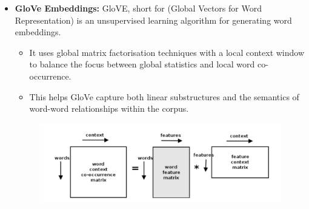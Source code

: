 \begin{itemize}
    \item \textbf{GloVe Embeddings: } GloVE, short for (Global Vectors for Word Representation) is an unsupervised learning algorithm for generating word embeddings.
    \begin{itemize}
        \item It uses global matrix factorisation techniques with a local context window to balance the focus between global statistics and local word co-occurrence.
        \item This helps GloVe capture both linear substructures and the semantics of word-word relationships within the corpus.
    \end{itemize}
    \begin{figure}[H]
        \centering
        \includegraphics[width=0.75\linewidth]{img/glove.png}
        
    \end{figure}
\end{itemize}

